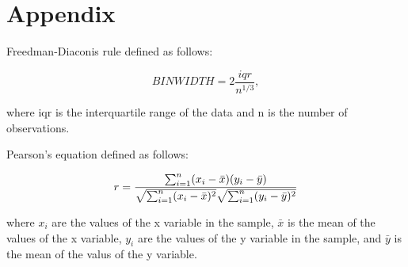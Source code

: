 \documentclass[12pt, letterpaper, titlepage]{article}
\begin{document}
\section{Appendix}
\label{sec:apx}

Freedman-Diaconis rule defined as follows:

\begin{equation}
  \label{eq:freedman-diaconis}
  BIN WIDTH = 2 \frac{iqr}{n^{1/3}},
\end{equation}

where iqr is the interquartile range of the data and n is the number of observations.

Pearson's equation defined as follows:

\begin{equation}
  \label{eq:pearson}
  r = \frac{ \sum_{i=1}^{n}(x_i-\bar{x})(y_i-\bar{y}) }{%
  \sqrt{\sum_{i=1}^{n}(x_i-\bar{x})^2}\sqrt{\sum_{i=1}^{n}(y_i-\bar{y})^2}}
\end{equation}

where \begin{math}x_{i}\end{math} are the values of the x variable in the sample, \begin{math}\bar{x}\end{math} is the mean of the values of the x variable, \begin{math}y_{i}\end{math} are the values of the y variable in the sample, and \begin{math}\bar{y}\end{math} is the mean of the valus of the y variable.
\end{document}
